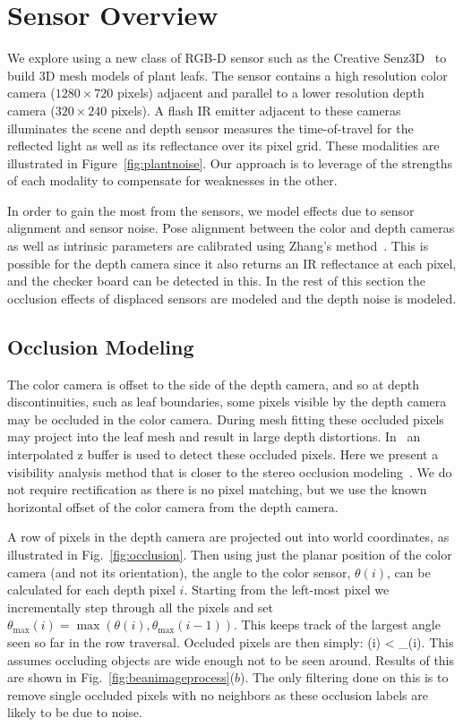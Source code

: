 \section{Sensor Overview}
\label{sec:overview}

We explore using a new class of RGB-D sensor such as the Creative Senz3D~\cite{nguyen2015vietnamese} to build 3D mesh models of plant leafs. The sensor contains a high resolution color camera ($1280 \times 720$ pixels) adjacent and parallel to a lower resolution depth camera ($320\times240$ pixels).  A flash IR emitter adjacent to these cameras illuminates the scene and depth sensor measures the time-of-travel for the reflected light as well as its reflectance over its pixel grid.  These modalities are illustrated in Figure~\ref{fig:plantnoise}.  Our approach is to leverage of the strengths of each modality to compensate for weaknesses in the other.  

In order to gain the most from the sensors, we model effects due to sensor alignment and sensor noise.  Pose alignment between the color and depth cameras as well as intrinsic parameters are calibrated using Zhang's method~\cite{Zhang2000}.  This is possible for the depth camera since it also returns an IR reflectance at each pixel, and the checker board can be detected in this.  In the rest of this section the occlusion effects of displaced sensors are modeled and the depth noise is modeled.


\subsection{Occlusion Modeling}

The color camera is offset to the side of the depth camera, and so at depth discontinuities, such as leaf boundaries, some pixels visible by the depth camera may be occluded in the color camera.  During mesh fitting these occluded pixels may project into the leaf mesh and result in large depth distortions.  In~\cite{Alenya2011} an interpolated z buffer is used to detect these occluded pixels.  Here we present a visibility analysis method that is closer to the stereo occlusion modeling~\cite{Belhumeur1996}.  We do not require rectification as there is no pixel matching, but we use the known horizontal offset of the color camera from the depth camera.

A row of pixels in the depth camera are projected out into world coordinates, as illustrated in Fig.~\ref{fig:occlusion}.  Then using just the planar position of the color camera (and not its orientation), the angle to the color sensor, $\theta(i)$, can be calculated for each depth pixel $i$.  Starting from the left-most pixel we incrementally step through all the pixels and set $\theta_{\max}(i) = \max(\theta(i),\theta_{\max}(i-1))$.  This keeps track of the largest angle seen so far in the row traversal.  Occluded pixels are then simply:
\beq
\theta(i) < \theta_{\max}(i). \label{eq:occluded}
\eeq
This assumes occluding objects are wide enough not to be seen around.  Results of this are shown in Fig.~\ref{fig:beanimageprocess}($b$).  The only filtering done on this is to remove single occluded pixels with no neighbors as these occlusion labels are likely to be due to noise.

